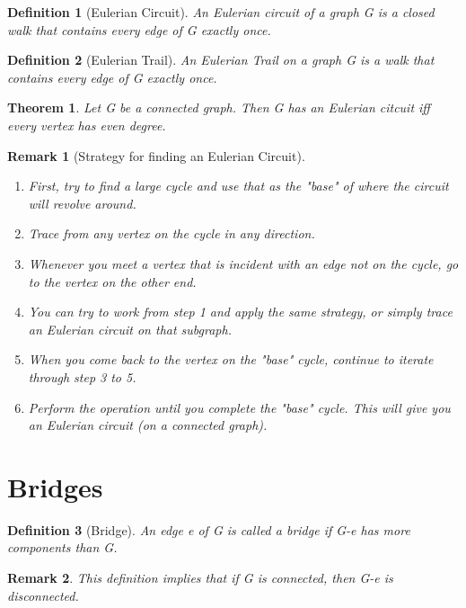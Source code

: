 \documentclass[11pt, oneside]{book}
\theoremstyle{break}
\newtheorem{thm}{Theorem}[section]
\newtheorem{defn}{Definition}[section]
\newtheorem*{remark}{Remark}
\begin{document}
\begin{defn}[Eulerian Circuit]
	An Eulerian circuit of a graph G is a closed walk that contains every edge of G exactly once.
\end{defn}

\begin{defn}[Eulerian Trail]
	An Eulerian Trail on a graph G is a walk that contains every edge of G exactly once.
\end{defn}

\begin{thm}
	Let G be a connected graph. Then G has an Eulerian citcuit iff every vertex has even degree.
\end{thm}

\begin{remark}[Strategy for finding an Eulerian Circuit]
	\begin{enumerate}
		\item First, try to find a large cycle and use that as the "base" of where the circuit will revolve around.
		\item Trace from any vertex on the cycle in any direction.
		\item Whenever you meet a vertex that is incident with an edge not on the cycle, go to the vertex on the other end.
		\item You can try to work from step 1 and apply the same strategy, or simply trace an Eulerian circuit on that subgraph.
		\item When you come back to the vertex on the "base" cycle, continue to iterate through step 3 to 5.
		\item Perform the operation until you complete the "base" cycle. This will give you an Eulerian circuit (on a connected graph).
	\end{enumerate}
\end{remark}


\section{Bridges}

\begin{defn}[Bridge]
	An edge e of G is called a bridge if G-e has more components than G.
\end{defn}

\begin{remark}
	This definition implies that if G is connected, then G-e is disconnected.
\end{remark}
\end{document}
